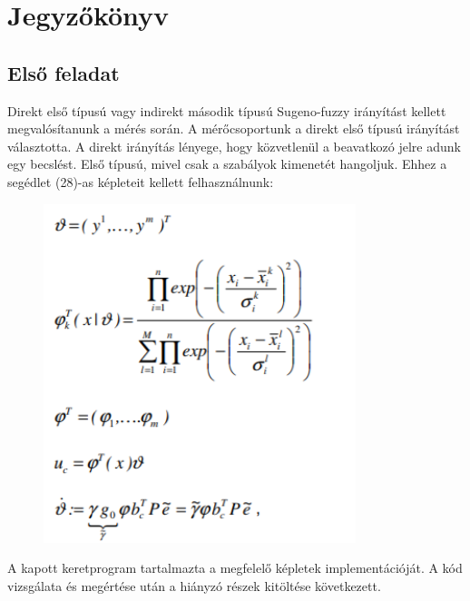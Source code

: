 \chapter{Jegyzőkönyv}

\section{Első feladat}
Direkt első típusú vagy indirekt második típusú Sugeno-fuzzy irányítást kellett megvalósítanunk a mérés során. A mérőcsoportunk a direkt első típusú irányítást választotta. A direkt irányítás lényege, hogy közvetlenül a beavatkozó jelre adunk egy becslést. Első típusú, mivel csak a szabályok kimenetét hangoljuk. Ehhez a segédlet (28)-as képleteit kellett felhasználnunk:

\begin{figure}[!h]
	\centering
	\includegraphics[width=91mm, keepaspectratio]{figures/m03/fig1.png}
	\label{fig:fig1}
\end{figure}


A kapott keretprogram tartalmazta a megfelelő képletek implementációját.
A kód vizsgálata és megértése után a hiányzó részek kitöltése következett.



\newpage
